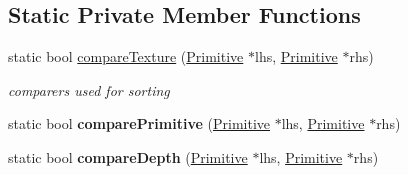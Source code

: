 \subsection*{Static Private Member Functions}
\begin{DoxyCompactItemize}
\item 
\mbox{\label{classnta_1_1PrimitiveBatch_a84712b51e21465f4943cce9f7b20a36b}} 
static bool \hyperlink{classnta_1_1PrimitiveBatch_a84712b51e21465f4943cce9f7b20a36b}{compare\+Texture} (\hyperlink{structnta_1_1Primitive}{Primitive} $\ast$lhs, \hyperlink{structnta_1_1Primitive}{Primitive} $\ast$rhs)
\begin{DoxyCompactList}\small\item\em comparers used for sorting \end{DoxyCompactList}\item 
\mbox{\label{classnta_1_1PrimitiveBatch_ad2da44830d62dda2177542faf32404e2}} 
static bool {\bfseries compare\+Primitive} (\hyperlink{structnta_1_1Primitive}{Primitive} $\ast$lhs, \hyperlink{structnta_1_1Primitive}{Primitive} $\ast$rhs)
\item 
\mbox{\label{classnta_1_1PrimitiveBatch_a8e08dc9967ad1fc382360ea02344e1d7}} 
static bool {\bfseries compare\+Depth} (\hyperlink{structnta_1_1Primitive}{Primitive} $\ast$lhs, \hyperlink{structnta_1_1Primitive}{Primitive} $\ast$rhs)
\end{DoxyCompactItemize}
